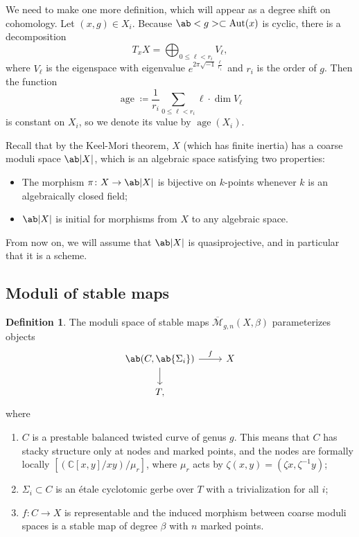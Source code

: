 \documentclass{amsart}
\theoremstyle{definition}
\newtheorem{defn}[thm]{Definition}
\theoremstyle{remark}
\theoremstyle{plain}
\theoremstyle{definition}
\theoremstyle{remark}
\newcommand{\C}{\mathbb{C}}
\newcommand{\mc}[1]{\mathcal{#1}}
\newcommand{\on}[1]{\operatorname{#1}}
\newcommand{\ol}[1]{\overline{#1}}
\newcommand{\1}{\mathbf{1}}
\newcommand{\2}{\mathbf{2}}
\newcommand{\3}{\mathbf{3}}
\DeclareMathOperator{\Aut}{Aut}
\begin{document}
We need to make one more definition, which will appear as a degree shift on cohomology. Let $(x,g) \in X_i$. Because $\ab<g> \subset \Aut(x)$ is cyclic, there is a decomposition
\[ T_x X = \bigoplus_{0 \leq \ell < r_i} V_{\ell}, \]
where $V_{\ell}$ is the eigenspace with eigenvalue $e^{2\pi \sqrt{-1} \frac{\ell}{r_i}}$ and $r_i$ is the order of $g$. Then the function
\[ \on{age} \coloneqq \frac{1}{r_i} \sum_{0 \leq \ell < r_i} \ell \cdot \dim V_{\ell} \]
is constant on $X_i$, so we denote its value by $\on{age}(X_i)$.

Recall that by the Keel-Mori theorem, $X$ (which has finite inertia) has a coarse moduli space $\ab|X|$, which is an algebraic space satisfying two properties:
\begin{itemize}
    \item The morphism $\pi \colon X \to \ab|X|$ is bijective on $k$-points whenever $k$ is an algebraically closed field;
    \item $\ab|X|$ is initial for morphisms from $X$ to any algebraic space.
\end{itemize}
From now on, we will assume that $\ab|X|$ is quasiprojective, and in particular that it is a scheme.

\subsection{Moduli of stable maps}%
\label{sub:Moduli of stable maps}

\begin{defn}
    The moduli space of stable maps $\ol{\mc{M}}_{g,n}(X,\beta)$ parameterizes objects
    \begin{equation*}
    \begin{tikzcd}
        \ab(C, \ab\{\Sigma_i\}) \ar{r}{f} \ar{d} & X \\
        T,
    \end{tikzcd}
    \end{equation*}
    where
    \begin{enumerate}
        \item $C$ is a prestable balanced twisted curve of genus $g$. This means that $C$ has stacky structure only at nodes and marked points, and the nodes are formally locally $[(\C[x,y]/xy)/\mu_r]$, where $\mu_r$ acts by $\zeta(x,y) = (\zeta x, \zeta^{-1} y)$;
        \item $\Sigma_i \subset C$ is an \'etale cyclotomic gerbe over $T$ with a trivialization for all $i$;
        \item $f \colon C \to X$ is representable and the induced morphism between coarse moduli spaces is a stable map of degree $\beta$ with $n$ marked points.
    \end{enumerate}
\end{defn}
\end{document}

